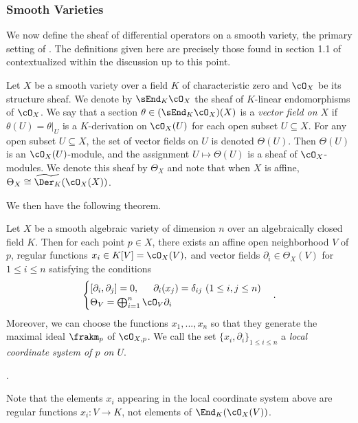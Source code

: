 \subsubsection{Smooth Varieties}\label{sec:diff-ops-smooth-varieties}
We now define the sheaf of differential operators on a smooth variety, the primary setting of \cite{d-mod_ps-rt}. The definitions given here are precisely those found in section 1.1 of \cite{d-mod_ps-rt} contextualized within the discussion up to this point.

\begin{defn}\label{defn:diff-ops-on-variety}
	Let $X$ be a smooth variety over a field $K$ of characteristic zero and $\cO_X$ be its structure sheaf. We denote by $\sEnd_K\cO_X$ the sheaf of $K$-linear endomorphisms of $\cO_X$. We say that a section $\theta \in (\sEnd_K\cO_X)(X)$ is a \emph{vector field on $X$} if $\theta(U) = \theta|_U$ is a $K$-derivation on $\cO_X(U)$ for each open subset $U \subseteq X$. For any open subset $U \subseteq X$, the set of vector fields on $U$ is denoted $\Theta(U)$. Then $\Theta(U)$ is an $\cO_X(U)$-module, and the assignment $U\mapsto \Theta(U)$ is a sheaf of $\cO_X$-modules. We denote this sheaf by $\Theta_X$ and note that when $X$ is affine, $\Theta_X \cong \widetilde{\Der_K}(\cO_X(X))$.
\end{defn}
We then have the following theorem.
\begin{thm}\label{thm:sheaf-of-vector-fields}
	Let $X$ be a smooth algebraic variety of dimension $n$ over an algebraically closed field $K$. Then for each point $p \in X$, there exists an affine open neighborhood $V$ of $p$, regular functions $x_i \in K[V] = \cO_X(V),$ and vector fields $\partial_i \in \Theta_X(V)$ for $1\leq i\leq n$ satisfying the conditions
	\begin{align*}
		\begin{cases}
		    [\partial_i,\partial_j] = 0, \hspace{1.5em} \partial_i(x_j) = \delta_{ij} ~ (1\leq i, j\leq n) \\
			\Theta_V = \bigoplus_{i=1}^n \cO_V \partial_i
		\end{cases}.
	\end{align*}
	Moreover, we can choose the functions $x_1,...,x_n$ so that they generate the maximal ideal $\frakm_p$ of $\cO_{X,p}$. We call the set $\{x_i,\partial_i\}_{1\leq i\leq n}$ a \emph{local coordinate system of $p$ on $U$}.
\end{thm}
\begin{prf}
	{\cite[Theorem A.5.1]{d-mod_ps-rt}}.
\end{prf}
Note that the elements $x_i$ appearing in the local coordinate system above are regular functions $x_i:V \to K$, not elements of $\End_K(\cO_X(V))$.

